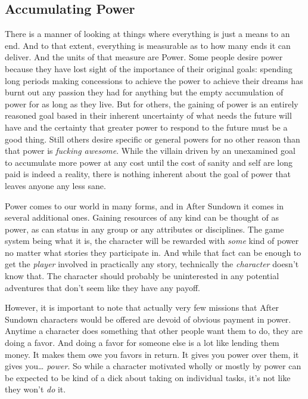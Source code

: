 \subsection{Accumulating Power}

There is a manner of looking at things where everything is just a means to an end. And to that extent, everything is measurable as to how many ends it can deliver. And the units of that measure are Power. Some people desire power because they have lost sight of the importance of their original goals: spending long periods making concessions to achieve the power to achieve their dreams has burnt out any passion they had for anything but the empty accumulation of power for as long as they live. But for others, the gaining of power is an entirely reasoned goal based in their inherent uncertainty of what needs the future will have and the certainty that greater power to respond to the future must be a good thing. Still others desire specific or general powers for no other reason than that power is \textit{fucking awesome}. While the villain driven by an unexamined goal to accumulate more power at any cost until the cost of sanity and self are long paid is indeed a reality, there is nothing inherent about the goal of power that leaves anyone any less sane.

Power comes to our world in many forms, and in After Sundown it comes in several additional ones. Gaining resources of any kind can be thought of as power, as can status in any group or any attributes or disciplines. The game system being what it is, the character will be rewarded with \textit{some} kind of power no matter what stories they participate in. And while that fact can be enough to get the \textit{player} involved in practically any story, technically the \textit{character} doesn't know that. The character should probably be uninterested in any potential adventures that don't seem like they have any payoff.

However, it is important to note that actually very few missions that After Sundown characters would be offered are devoid of obvious payment in power. Anytime a character does something that other people want them to do, they are doing a favor. And doing a favor for someone else is a lot like lending them money. It makes them owe you favors in return. It gives you power over them, it gives you\ldots{} \textit{power}. So while a character motivated wholly or mostly by power can be expected to be kind of a dick about taking on individual tasks, it's not like they won't \textit{do} it.

